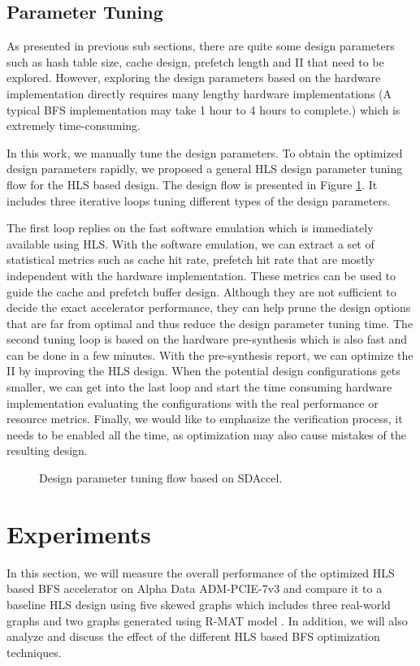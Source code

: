 \subsection{Parameter Tuning}
As presented in previous sub sections, there are quite some design 
parameters such as hash table size, cache design, prefetch 
length and II that need to be explored. However, exploring the design parameters 
based on the hardware implementation directly requires many lengthy 
hardware implementations (A typical BFS implementation may 
take 1 hour to 4 hours to complete.) which is extremely time-consuming.

In this work, we manually tune the design parameters. To obtain the 
optimized design parameters rapidly, we proposed a general HLS design 
parameter tuning flow for the HLS based design. The design flow is 
presented in Figure \ref{fig:parameter-tuning}. It includes three 
iterative loops tuning different types of the design parameters.

The first loop replies on the fast software emulation which is 
immediately available using HLS.
With the software emulation, we can extract a set of statistical 
metrics such as cache hit rate, prefetch hit rate that are 
mostly independent with the hardware implementation. These metrics can be used to 
guide the cache and prefetch buffer design. Although they 
are not sufficient to decide the exact accelerator performance, they 
can help prune the design options that are far from optimal and thus reduce 
the design parameter tuning time. The second tuning loop is based on the hardware 
pre-synthesis which is also fast and can be done in a few minutes. 
With the pre-synthesis report, we can optimize the II by 
improving the HLS design. When the potential design 
configurations gets smaller, we can get into the last loop and start the time consuming 
hardware implementation evaluating the configurations with the real 
performance or resource metrics. Finally, we would like to emphasize the verification process, 
it needs to be enabled all the time, as optimization may also cause mistakes of the resulting design.

\begin{figure}
    \caption{Design parameter tuning flow based on SDAccel.}
\label{fig:parameter-tuning}
\end{figure}


\section{Experiments} \label{sec:experiment}
In this section, we will measure the overall performance of the optimized 
HLS based BFS accelerator on Alpha Data ADM-PCIE-7v3 and 
compare it to a baseline HLS design using five skewed graphs which includes 
three real-world graphs and two graphs generated using R-MAT model \cite{chakrabarti2004rmat}.
In addition, we will also analyze and discuss the effect of the different HLS based 
BFS optimization techniques.

